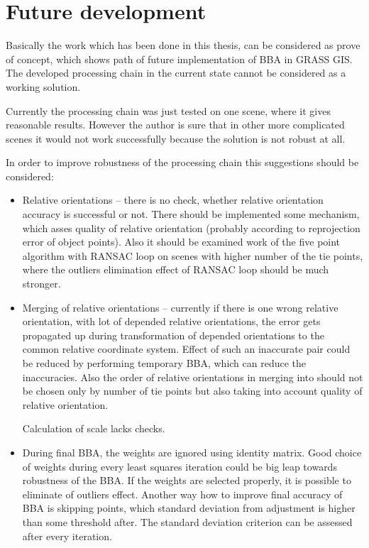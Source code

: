 \documentclass[a4paper,12pt]{article}
\begin{document}

\section{Future development}


Basically the work which has been done in this thesis, can be considered as prove of concept,
which shows path of future implementation of BBA in GRASS GIS. The developed 
processing chain in the current state cannot be considered as a working solution.


Currently  the processing chain was just tested 
 on one scene, where it gives reasonable results. However 
the author is sure that in other more complicated scenes it would not work successfully because 
the solution is not robust at all.

In order to improve robustness of the processing chain this suggestions should be considered:
\begin{itemize}
\item Relative orientations -- there is no check, whether relative orientation accuracy is successful or not. There 
should be implemented some mechanism, which asses quality of relative orientation (probably according to reprojection error of object points).
Also it should be examined work of the five point algorithm with RANSAC loop on scenes with higher number of the tie points, where 
the outliers elimination effect of RANSAC loop should be much stronger.
\item  Merging of relative orientations -- currently if there is one wrong relative orientation, with lot of depended relative orientations,
the error gets propagated up during transformation of depended orientations to the common relative coordinate system. 
Effect of such an inaccurate pair could be 
reduced by performing  temporary BBA, which can reduce the inaccuracies. Also the order of relative orientations in merging 
into  should not 
be chosen only by number of tie points but also taking into account quality of relative orientation.

Calculation of scale lacks checks.


\item During final BBA, the weights are ignored using identity matrix. Good choice of weights during every least squares iteration 
could be big leap towards robustness of the BBA. If the weights are selected properly, it is possible to eliminate of outliers 
effect.
Another way how to improve final accuracy of BBA is skipping points, which 
standard deviation from adjustment is higher than some threshold after. The standard deviation criterion can be assessed 
after every iteration.
\end{itemize}
\end{document}
